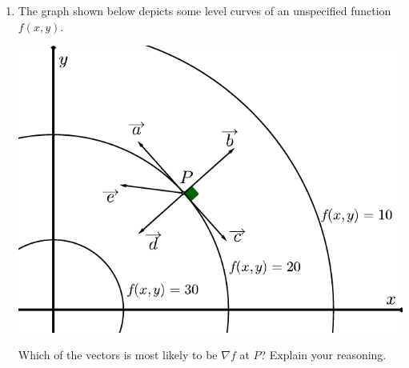 \documentclass[12pt]{article}
\newif\ifans
\begin{document}
\begin{enumerate}
\item The graph shown below depicts some level curves of an unspecified function $f(x,y)$.  

\begin{center}
\includegraphics[scale=0.9]{gradient.pdf}
\end{center}

Which of the vectors is most likely to be $\nabla f$ at $P$?  Explain your reasoning.

\ifans{\fbox{\parbox{1\linewidth}{$\overrightarrow{d}$.  $\nabla f (P)$ should point in the direction of greatest increase and it should be normal to point $P$ on the level curve of $f(x,y)$.}}} \fi

\end{enumerate}
\end{document}
